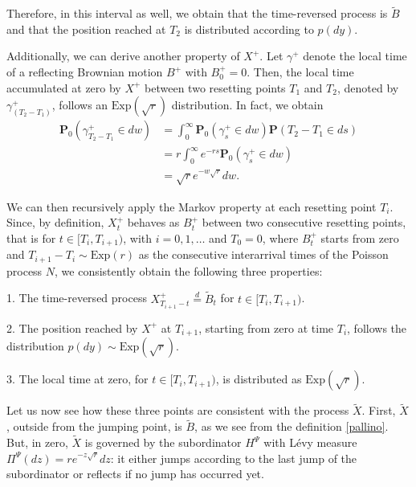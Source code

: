 \documentclass[11pt,a4paper]{article}
\theoremstyle{definition}
\theoremstyle{remark}
\begin{document}
Therefore, in this interval as well, we obtain that the time-reversed process is \( \widetilde{B} \) and that the position reached at \( T_2 \) is distributed according to \( p(dy) \).  

Additionally, we can derive another property of \( X^+ \). Let \(\gamma^+\) denote the local time of a reflecting Brownian motion \(B^+\) with \(B^+_0=0\). Then, the local time accumulated at zero by \(X^+\) between two resetting points \(T_1\) and \(T_2\), denoted by \(\gamma^+_{(T_{2} - T_1)}\), follows an \(\text{Exp}(\sqrt{r})\) distribution. In fact, we obtain  
\begin{align*}
	\mathbf{P}_0 (\gamma^+_{T_2-T_1} \in dw) &= \int_0^\infty \mathbf{P}_0 (\gamma^+_{s} \in dw) \mathbf{P}(T_2-T_1 \in ds)  \\
	&= r \int_0^\infty e^{-rs} \mathbf{P}_0 (\gamma^+_{s} \in dw) \\
	&= \sqrt{r} e^{-w \sqrt{r}} dw.
\end{align*}  

We can then recursively apply the Markov property at each resetting point \( T_i \). Since, by definition, \( X^+_t \) behaves as \( B^+_t \) between two consecutive resetting points, that is for  \(t \in [T_i, T_{i+1})\), with \( i = 0,1, \dots \) and \( T_0 = 0 \), where \( B^+_t \) starts from zero and \( T_{i+1} - T_i \sim \text{Exp}(r) \) as the consecutive interarrival times of the Poisson process \(N\), we consistently obtain the following three properties:  

1. The time-reversed process \( X^+_{T_{i+1} - t} \stackrel{d}{=} \widetilde{B}_t \) for \( t \in [T_i, T_{i+1}) \).  

2. The position reached by \( X^+ \) at \( T_{i+1} \), starting from zero at time \( T_i \), follows the distribution \( p(dy) \sim \text{Exp}(\sqrt{r}) \).  

3. The local time at zero, for \( t \in [T_i, T_{i+1}) \), is distributed as \( \text{Exp}(\sqrt{r}) \).  


\noindent
Let us now see how these three points are consistent with the process \( \widetilde{X} \). First, \(\widetilde{X}\), outside from the jumping point, is \(\widetilde{B}\), as we see from the definition \eqref{pallino}. But, in zero, \(\widetilde{X}\) is governed by the subordinator \(H^\Psi\) with L\'evy measure \(\Pi^\Psi(dz)= r e^{-z\sqrt{r}} dz\): it either jumps according to the last jump of the subordinator or reflects if no jump has occurred yet.
\end{document}

